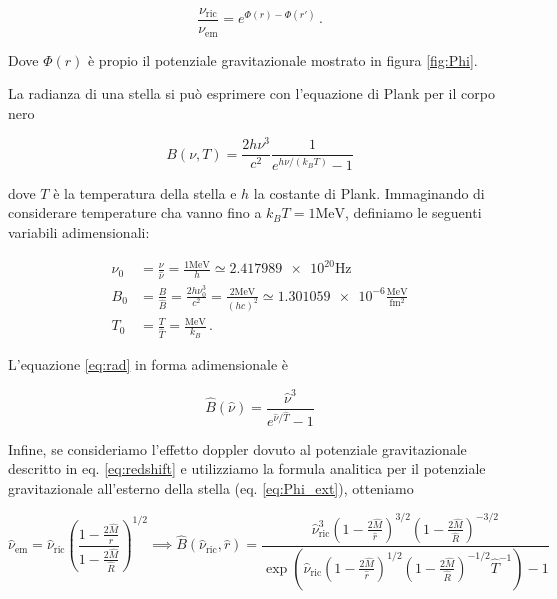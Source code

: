 \documentclass[a4paper, titlepage]{article}
\begin{document}
\begin{equation}
    \frac{\nu_\text{ric}}{\nu_\text{em}} = e^{\Phi (r) - \Phi (r')} \, .
\label{eq:redshift}
\end{equation}

Dove $\Phi (r)$ è propio il potenziale gravitazionale mostrato in figura
\ref{fig:Phi}.

La radianza di una stella si può esprimere con l'equazione di Plank per il corpo
nero

\begin{equation}
    B(\nu, T) = \frac{2 h \nu ^3}{c^2} \frac{1}{e^{h \nu / (k_B T)} - 1}
    \label{eq:rad}
\end{equation}

dove $T$ è la temperatura della stella e $h$ la costante di Plank.
Immaginando di considerare temperature cha vanno fino a $k_B T = 1
\unit{\mega\electronvolt}$, definiamo le seguenti variabili adimensionali:

\begin{subequations}
\begin{align}
    \nu_0 &= \frac{\nu}{\hat \nu} = \frac{1\unit{\mega\electronvolt}}{h} \simeq
    \num{2.417989e20} \unit{\hertz} \label{eq:nu0def} \\
    B_0 &= \frac{B}{\hat B} = \frac{2 h \nu_0^3}{c^2}
    = \frac{2 \unit{\mega\electronvolt}}{(h c)^2} \simeq \num{1.301059e-6}
    \frac{\unit{\mega\electronvolt}}{\unit{\femto\meter\squared}} \\
    T_0 &= \frac{T}{\hat T} = \frac{\unit{\mega\electronvolt}}{k_B} \, .
\end{align}
\label{eq:B0def}
\end{subequations}

L'equazione \ref{eq:rad} in forma adimensionale è

\begin{equation}
    \hat B(\hat \nu) = \frac{\hat \nu ^3}{e^{\hat \nu / \hat T} - 1}
    \label{eq:B_ad}
\end{equation}


Infine, se consideriamo l'effetto doppler dovuto al potenziale gravitazionale
descritto in eq. \ref{eq:redshift} e utilizziamo la formula analitica per il
potenziale gravitazionale all'esterno della stella (eq. \ref{eq:Phi_ext}),
otteniamo

\begin{equation}
    \hat \nu_\text{em} = \hat \nu_\text{ric}
    \left(\frac{1 - \frac{2 \hat M}{r}}{1 - \frac{2 \hat M}{\hat R}}\right)^{1/2}
    \implies
    \hat B(\hat \nu_\text{ric}, \hat r) =
    \frac{\hat \nu_\text{ric}^3 \left(1 - \frac{2 \hat M}{\hat r}\right)^{3/2}
    \left(1 - \frac{2 \hat M}{\hat R}\right)^{-3/2} }
    {\exp( \hat \nu_\text{ric} \left(1 - \frac{2 \hat M}{\hat r} \right)^{1/2}
    \left(1 - \frac{2 \hat M}{\hat R}\right)^{-1/2} \hat T^{-1}) - 1}
    \label{eq:B_corr}
\end{equation}
\end{document}
